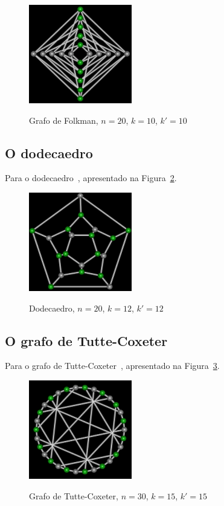 \begin{figure}[htb]
\centering
\includegraphics[width=0.4\textwidth]{img/folkman.png}
\label{fig:example-folkman}
\caption{Grafo de Folkman, $n=20$, $k=10$, $k'=10$}
\end{figure}


\subsection{O dodecaedro}
Para o dodecaedro~\cite{cite:example-plato},
apresentado na Figura~\ref{fig:example-dodecaedro}.

\begin{figure}[htb]
\centering
\includegraphics[width=0.4\textwidth]{img/dodecaedro.png}
\label{fig:example-dodecaedro}
\caption{Dodecaedro, $n=20$, $k=12$, $k'=12$}
\end{figure}

\subsection{O grafo de Tutte-Coxeter}
Para o grafo de Tutte-Coxeter~\cite{cite:example-tutte},
apresentado na Figura~\ref{fig:example-tutte}.

\begin{figure}[htb]
\centering
\includegraphics[width=0.4\textwidth]{img/tutte.png}
\label{fig:example-tutte}
\caption{Grafo de Tutte-Coxeter, $n=30$, $k=15$, $k'=15$}
\end{figure}


